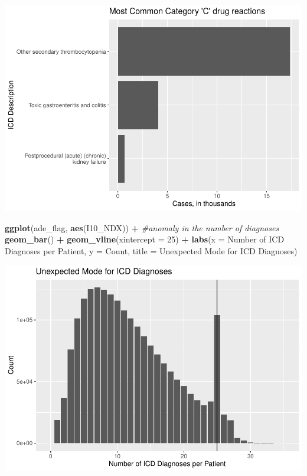 \documentclass[preprint, 3p,
authoryear]{elsarticle} %
\newenvironment{Shaded}{\begin{snugshade}}{\end{snugshade}}
\newcommand{\CommentTok}[1]{\textcolor[rgb]{0.56,0.35,0.01}{\textit{#1}}}
\newcommand{\DataTypeTok}[1]{\textcolor[rgb]{0.13,0.29,0.53}{#1}}
\newcommand{\DecValTok}[1]{\textcolor[rgb]{0.00,0.00,0.81}{#1}}
\newcommand{\KeywordTok}[1]{\textcolor[rgb]{0.13,0.29,0.53}{\textbf{#1}}}
\newcommand{\NormalTok}[1]{#1}
\newcommand{\OperatorTok}[1]{\textcolor[rgb]{0.81,0.36,0.00}{\textbf{#1}}}
\newcommand{\StringTok}[1]{\textcolor[rgb]{0.31,0.60,0.02}{#1}}
\begin{document}
\includegraphics{final-project-paper_files/figure-latex/top-10-ade-cat-ab-3.pdf}

\begin{Shaded}
\begin{Highlighting}[]
\KeywordTok{ggplot}\NormalTok{(ade\_flag, }\KeywordTok{aes}\NormalTok{(I10\_NDX)) }\OperatorTok{+}\StringTok{ }\CommentTok{\#anomaly in the number of diagnoses}
\StringTok{  }\KeywordTok{geom\_bar}\NormalTok{() }\OperatorTok{+}
\StringTok{  }\KeywordTok{geom\_vline}\NormalTok{(}\DataTypeTok{xintercept =} \DecValTok{25}\NormalTok{) }\OperatorTok{+}
\StringTok{  }\KeywordTok{labs}\NormalTok{(}\DataTypeTok{x =} \StringTok{\textquotesingle{}Number of ICD Diagnoses per Patient\textquotesingle{}}\NormalTok{, }\DataTypeTok{y =} \StringTok{\textquotesingle{}Count\textquotesingle{}}\NormalTok{, }\DataTypeTok{title =} \StringTok{\textquotesingle{}Unexpected Mode for ICD Diagnoses\textquotesingle{}}\NormalTok{)}
\end{Highlighting}
\end{Shaded}

\includegraphics{final-project-paper_files/figure-latex/n-Diagnoses-1.pdf}
\end{document}
